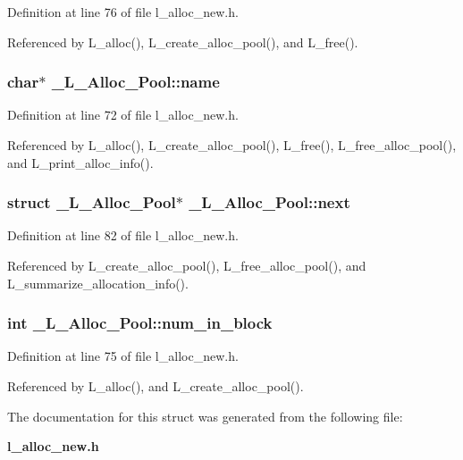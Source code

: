 Definition at line 76 of file l\_\-alloc\_\-new.h.

Referenced by L\_\-alloc(), L\_\-create\_\-alloc\_\-pool(), and L\_\-free().
\subsubsection{\setlength{\rightskip}{0pt plus 5cm}char$\ast$ \bf{\_\-L\_\-Alloc\_\-Pool::name}}\label{struct__L__Alloc__Pool_d2548ea1906142ede4143bdc09135c7d}




Definition at line 72 of file l\_\-alloc\_\-new.h.

Referenced by L\_\-alloc(), L\_\-create\_\-alloc\_\-pool(), L\_\-free(), L\_\-free\_\-alloc\_\-pool(), and L\_\-print\_\-alloc\_\-info().
\subsubsection{\setlength{\rightskip}{0pt plus 5cm}struct \bf{\_\-L\_\-Alloc\_\-Pool}$\ast$ \bf{\_\-L\_\-Alloc\_\-Pool::next}}\label{struct__L__Alloc__Pool_12fcb347a0f64ba371088f0dd7d45863}




Definition at line 82 of file l\_\-alloc\_\-new.h.

Referenced by L\_\-create\_\-alloc\_\-pool(), L\_\-free\_\-alloc\_\-pool(), and L\_\-summarize\_\-allocation\_\-info().
\subsubsection{\setlength{\rightskip}{0pt plus 5cm}int \bf{\_\-L\_\-Alloc\_\-Pool::num\_\-in\_\-block}}\label{struct__L__Alloc__Pool_caa11ef153b9d7cb3cc71ffb0e923750}




Definition at line 75 of file l\_\-alloc\_\-new.h.

Referenced by L\_\-alloc(), and L\_\-create\_\-alloc\_\-pool().

The documentation for this struct was generated from the following file:\begin{CompactItemize}
\item 
\bf{l\_\-alloc\_\-new.h}\end{CompactItemize}
